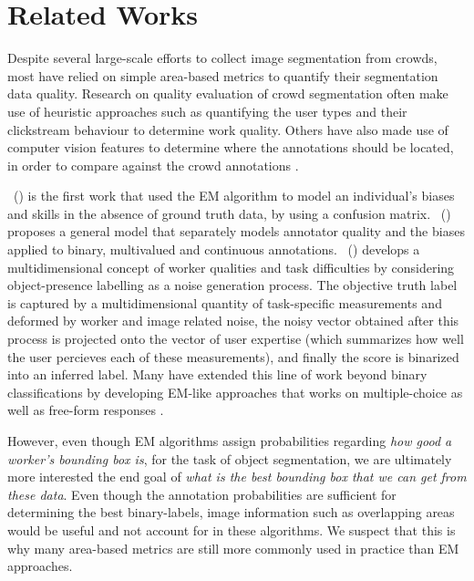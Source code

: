\documentclass[12pt]{article}
\newcommand\citeay[1]{%
  \citeauthor{#1}~(\citeyear{#1})}
\begin{document}
\section{Related Works}
\par Despite several large-scale efforts to collect image segmentation from crowds\cite{Lin2014,MartinFTM01,Torralba2010,pascal-voc-2012}, most have relied on simple area-based metrics to quantify their segmentation data quality. Research on quality evaluation of crowd segmentation often make use of heuristic approaches such as quantifying the user types and their clickstream behaviour to determine work quality\cite{Cabezas2015,Sameki2015}. Others have also made use of computer vision features to determine where the annotations should be located, in order to compare against the crowd annotations \cite{Vittayakorn2011,Russakovsky2015}.
\par \citeay{Dawid1979} is the first work that used the EM algorithm to model an individual's biases and skills in the absence of ground truth data, by using a confusion matrix. \citeay{OCWelinder2010} proposes a general model that separately models annotator quality and the biases applied to binary, multivalued and continuous annotations. \citeay{MDWWelinder2010} develops a multidimensional concept of worker qualities and task difficulties by considering object-presence labelling as a noise generation process. The objective truth label is captured by a multidimensional quantity of task-specific measurements and deformed by worker and image related noise, the noisy vector obtained after this process is projected onto the vector of user expertise (which summarizes how well the user percieves each of these measurements), and finally the score is binarized into an inferred label. Many have extended this line of work beyond binary classifications by developing EM-like approaches that works on multiple-choice \cite{Karger2013} as well as free-form responses \cite{Lin2012}. 
\par However, even though EM algorithms assign probabilities regarding  \textit{how good a worker's bounding box is}, for the task of object segmentation, we are ultimately more interested the end goal of \textit{what is the best bounding box that we can get from these data}. Even though the annotation probabilities are sufficient for determining the best binary-labels, image information such as overlapping areas would be useful and not account for in these algorithms. We suspect that this is why many area-based metrics are still more commonly used in practice than EM approaches.


\end{document}
